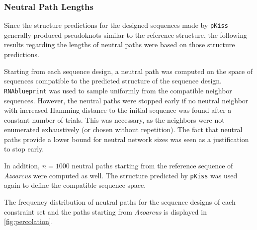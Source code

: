 \documentclass[../../master.tex]{subfiles}
\begin{document}
\subsubsection{Neutral Path Lengths}
\label{ssub:results:percolation}

Since the structure predictions for the designed sequences made by \texttt{pKiss} generally produced pseudoknots similar to the reference structure, the following results regarding the lengths of neutral paths were based on those structure predictions.

Starting from each sequence design, a neutral path was computed on the space of sequences compatible to the predicted structure of the sequence design.
\texttt{RNAblueprint} was used to sample uniformly from the compatible neighbor sequences.
However, the neutral paths were stopped early if no neutral neighbor with increased Hamming distance to the initial sequence was found after a constant number of trials.
This was necessary, as the neighbors were not enumerated exhaustively (or chosen without repetition).
The fact that neutral paths provide a lower bound for neutral network sizes was seen as a justification to stop early.

In addition, $n=1000$ neutral paths starting from the reference sequence of \textit{Azoarcus} were computed as well.
The structure predicted by \texttt{pKiss} was used again to define the compatible sequence space.

The frequency distribution of neutral paths for the sequence designs of each constraint set and the paths starting from \textit{Azoarcus} is displayed in \autoref{fig:percolation}.
\end{document}
